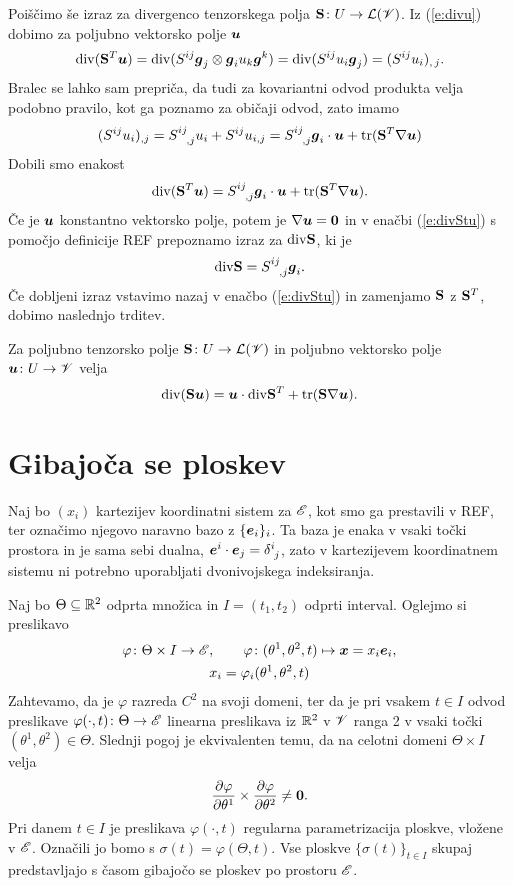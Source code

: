 Poiščimo še izraz za divergenco tenzorskega polja $\mathbf S\colon U\to\mathcal L(\mathscr V)$.
Iz (\ref{e:divu}) dobimo za poljubno vektorsko polje $\boldsymbol u$
\[
	\mathrm{div}(\mathbf S^{T}\boldsymbol u)=\mathrm{div}(S^{ij}\boldsymbol g_j\otimes\boldsymbol g_i u_k\boldsymbol g^k)
	=\mathrm{div}(S^{ij}u_i\boldsymbol g_j)=(S^{ij}u_i)_{,\,j}.
\]
Bralec se lahko sam prepriča, da tudi za kovariantni odvod produkta velja
podobno pravilo, kot ga poznamo za običaji odvod, zato imamo
\[
	(S^{ij}u_i)_{,j}=\topbot{S}{ij}{,j}u_i+S^{ij}u_{i,j}=
	\topbot{S}{ij}{,j}\vek{g}_i\cdot\vek{u}+\tr(\ten{S}^{T}\nabla\vek{u})
\]
Dobili smo enakost
\begin{equation} \label{e:divStu}
	\div(\ten{S}^{T}\vek{u})=\topbot{S}{ij}{,j}\vek{g}_i\cdot\vek{u}+\tr(\ten{S}^{T}\nabla\vek{u}).
\end{equation}
Če je $\boldsymbol u$ konstantno vektorsko polje, potem je $\nabla\boldsymbol u=\mathbf 0$ in v
enačbi (\ref{e:divStu}) s pomočjo definicije REF prepoznamo izraz za $\mathrm{div}\mathbf S$, ki je
\[
	\div\ten{S}=\topbot{S}{ij}{,j}\vek{g}_i.
\]
Če dobljeni izraz vstavimo nazaj v enačbo (\ref{e:divStu}) in zamenjamo $\mathbf S$ z
$\mathbf S^{T}$, dobimo naslednjo trditev.
\begin{trditev} \label{e:divSu}
	Za poljubno tenzorsko polje $\mathbf S\colon U\to\mathcal L(\mathscr V)$ in poljubno
	vektorsko polje $\boldsymbol u\colon U\to\mathscr V$ velja
	\[ \mathrm{div}(\mathbf S\boldsymbol u)=\boldsymbol u\cdot\mathrm{div}\mathbf S^{T}+\mathrm{tr}(\mathbf S\nabla\boldsymbol u). \]
\end{trditev}


\section{Gibajoča se ploskev}


Naj bo $(x_i)$ kartezijev koordinatni sistem za $\mathscr E$, kot smo ga prestavili v REF, ter označimo
njegovo naravno bazo z $\{\boldsymbol e_i\}_i$. Ta baza je enaka v vsaki točki prostora in je sama
sebi dualna, $\vek{e}^i\cdot\vek{e}_j=\topbot{\delta}{i}{j}$, zato v kartezijevem
koordinatnem sistemu ni potrebno uporabljati dvonivojskega indeksiranja.

Naj bo $\Theta\subseteq\mathbb R^2$ odprta množica in $I=(t_1,t_2)$ odprti interval.
Oglejmo si preslikavo
\begin{gather*}
	\varphi\colon\Theta\times I\to\mathscr E,\qquad \varphi\colon(\theta^1,\theta^2,t)\mapsto \boldsymbol x=x_i\boldsymbol e_i,\\
	x_i=\varphi_i(\theta^1,\theta^2,t)
\end{gather*}
Zahtevamo, da je $\varphi$ razreda $C^2$ na svoji domeni, ter da je pri vsakem $t\in I$ 
odvod preslikave $\varphi(\cdot,t)\colon \Theta\to\mathscr E$ linearna preslikava iz $\mathbb R^2$ v $\mathscr V$ ranga 2 v vsaki
točki $(\theta^1,\theta^2)\in\Theta$. Slednji pogoj je ekvivalenten temu, da na celotni domeni
$\Theta\times I$ velja
\[ \frac{\partial\varphi}{\partial\theta^1}\times\frac{\partial\varphi}{\partial\theta^2}\neq \boldsymbol 0. \]
Pri danem $t\in I$ je preslikava $\varphi(\cdot,t)$ regularna parametrizacija ploskve,
vložene v $\mathscr E$. Označili jo bomo s $\sigma(t)=\varphi(\Theta,t)$. Vse ploskve $\{\sigma(t)\}_{t\in I}$
skupaj predstavljajo s časom gibajočo se ploskev po prostoru $\mathscr E$.

